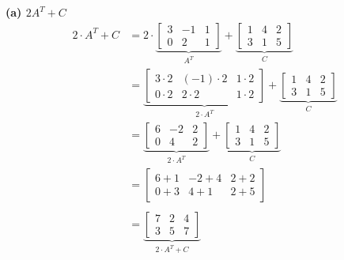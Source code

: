 \documentclass[a4paper,12pt]{article}
\begin{document}
\textbf{(a) $2A^{T} + C$}
\begin{align*}
2 \cdot A^{T} + C&=
    2 \cdot
    \underbrace{
    \begin{bmatrix}
        3 & -1 & 1\\
        0 & 2 & 1
    \end{bmatrix}}_{A^{T}} 
    +
    \underbrace{
    \begin{bmatrix}
        1 & 4 & 2 \\
        3 & 1 & 5
    \end{bmatrix}}_{C} \\
    &=
    \underbrace{
    \begin{bmatrix}
        3 \cdot 2 & (-1) \cdot 2 & 1 \cdot 2\\
        0 \cdot 2 & 2 \cdot 2 & 1 \cdot 2
    \end{bmatrix}}_{2 \cdot A^{T}}
    +
    \underbrace{
    \begin{bmatrix}
        1 & 4 & 2 \\
        3 & 1 & 5
    \end{bmatrix}}_{C} \\
    &=
    \underbrace{
    \begin{bmatrix}
        6 & -2 & 2\\
        0 & 4 & 2
    \end{bmatrix}}_{2 \cdot A^{T}}
    +
    \underbrace{
    \begin{bmatrix}
        1 & 4 & 2 \\
        3 & 1 & 5
    \end{bmatrix}}_{C} \\
    &=
    \begin{bmatrix}
        6 + 1 & -2 + 4 & 2 + 2\\
        0 + 3 & 4 + 1 & 2 + 5
    \end{bmatrix} \\ \\
    &=
    \underbrace{
    \begin{bmatrix}
        7 & 2 & 4\\
        3 & 5 & 7
    \end{bmatrix}}_{2 \cdot A^{T} + C}
\end{align*}
\end{document}
